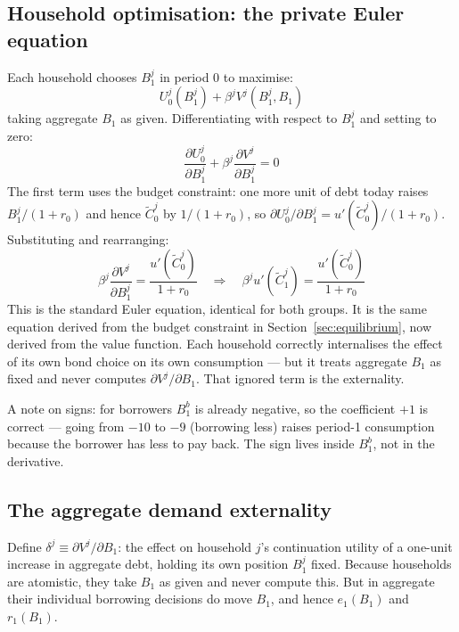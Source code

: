 \documentclass[11pt,a4paper]{article}
\begin{document}
\subsection{Household optimisation: the private Euler equation}

Each household chooses $B_1^j$ in period 0 to maximise:
\begin{equation}
U_0^j(B_1^j) + \beta^j V^j(B_1^j, B_1)
\end{equation}
taking aggregate $B_1$ as given. Differentiating with respect to $B_1^j$ and setting to zero:
\begin{equation}
\frac{\partial U_0^j}{\partial B_1^j} + \beta^j \frac{\partial V^j}{\partial B_1^j} = 0
\end{equation}
The first term uses the budget constraint: one more unit of debt today raises $B_1^j/(1+r_0)$ and hence $\tilde{C}_0^j$ by $1/(1+r_0)$, so $\partial U_0^j/\partial B_1^j = u'(\tilde{C}_0^j)/(1+r_0)$. Substituting and rearranging:
\begin{equation}
\beta^j \frac{\partial V^j}{\partial B_1^j} = \frac{u'(\tilde{C}_0^j)}{1+r_0} \quad\Rightarrow\quad \beta^j u'(\tilde{C}_1^j) = \frac{u'(\tilde{C}_0^j)}{1+r_0}
\end{equation}
This is the standard Euler equation, identical for both groups. It is the same equation derived from the budget constraint in Section~\ref{sec:equilibrium}, now derived from the value function. Each household correctly internalises the effect of its own bond choice on its own consumption --- but it treats aggregate $B_1$ as fixed and never computes $\partial V^j/\partial B_1$. That ignored term is the externality.

A note on signs: for borrowers $B_1^b$ is already negative, so the coefficient $+1$ is correct --- going from $-10$ to $-9$ (borrowing less) raises period-1 consumption because the borrower has less to pay back. The sign lives inside $B_1^b$, not in the derivative.

\subsection{The aggregate demand externality}\label{sec:subsec:ext}

Define $\delta^j \equiv \partial V^j/\partial B_1$: the effect on household $j$'s continuation utility of a one-unit increase in aggregate debt, holding its own position $B_1^j$ fixed. Because households are atomistic, they take $B_1$ as given and never compute this. But in aggregate their individual borrowing decisions do move $B_1$, and hence $e_1(B_1)$ and $r_1(B_1)$.
\end{document}
